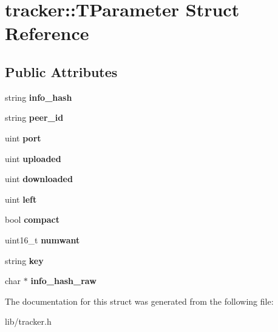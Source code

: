 \hypertarget{structtracker_1_1TParameter}{}\section{tracker\+:\+:T\+Parameter Struct Reference}
\label{structtracker_1_1TParameter}
\subsection*{Public Attributes}
\begin{DoxyCompactItemize}
\item 
\mbox{\label{structtracker_1_1TParameter_aefb0050bfd99eb6a30b547b3e8891dcd}} 
string {\bfseries info\+\_\+hash}
\item 
\mbox{\label{structtracker_1_1TParameter_aa4fecf8ffb04fac7e3929cef30f032ac}} 
string {\bfseries peer\+\_\+id}
\item 
\mbox{\label{structtracker_1_1TParameter_a37c80391b4706f15068938a5186ebcb5}} 
uint {\bfseries port}
\item 
\mbox{\label{structtracker_1_1TParameter_aca491cdfef7ea15eb10768389dd8d043}} 
uint {\bfseries uploaded}
\item 
\mbox{\label{structtracker_1_1TParameter_a4e7ad869a2a84c1773fa97e2f8ac7a70}} 
uint {\bfseries downloaded}
\item 
\mbox{\label{structtracker_1_1TParameter_ac4cfc3ad1c6e7cf4301d1940723e331a}} 
uint {\bfseries left}
\item 
\mbox{\label{structtracker_1_1TParameter_aa20b3bfd0be9058a717e277e917a1604}} 
bool {\bfseries compact}
\item 
\mbox{\label{structtracker_1_1TParameter_a21bb71f791e005b04f27d2d1ea1b7907}} 
uint16\+\_\+t {\bfseries numwant}
\item 
\mbox{\label{structtracker_1_1TParameter_a54bbbc985f11ea3d022d24e2dd9d8a92}} 
string {\bfseries key}
\item 
\mbox{\label{structtracker_1_1TParameter_ae88632924fe55b815994a2dc2bce67a2}} 
char $\ast$ {\bfseries info\+\_\+hash\+\_\+raw}
\end{DoxyCompactItemize}


The documentation for this struct was generated from the following file\+:\begin{DoxyCompactItemize}
\item 
lib/tracker.\+h\end{DoxyCompactItemize}
